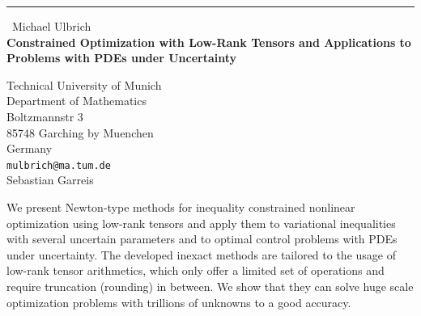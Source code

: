 \documentclass{report}
\begin{document}
\begin{center}
\rule{6in}{1pt} \
{\large Michael Ulbrich \\
{\bf Constrained Optimization with Low-Rank Tensors and Applications to Problems with PDEs under Uncertainty}}

Technical University of Munich \\ Department of Mathematics \\ Boltzmannstr 3 \\ 85748 Garching by Muenchen \\ Germany
\\
{\tt mulbrich@ma.tum.de}\\
Sebastian Garreis\end{center}

We present Newton-type methods for inequality constrained nonlinear
optimization using low-rank tensors and apply them to variational
inequalities with several uncertain parameters and to optimal control
problems with PDEs under uncertainty. The developed inexact methods are
tailored to the usage of low-rank tensor arithmetics, which only offer a
limited set of operations and require truncation (rounding) in between.
We show that they can solve huge scale optimization problems with
trillions of unknowns to a good accuracy.
\end{document}
